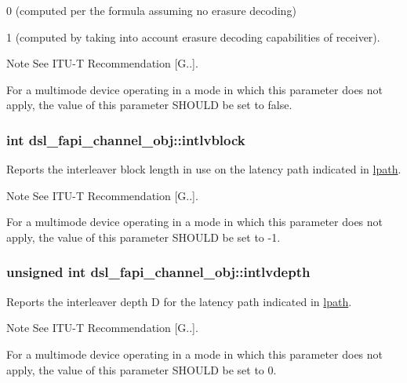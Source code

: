 \begin{DoxyItemize}
\item 0 (computed per the formula assuming no erasure decoding)
\item 1 (computed by taking into account erasure decoding capabilities of receiver). \begin{DoxyNote}{Note}
See I\-T\-U-\/\-T Recommendation \mbox{[}G..\mbox{]}. 

For a multimode device operating in a mode in which this parameter does not apply, the value of this parameter S\-H\-O\-U\-L\-D be set to false. 
\end{DoxyNote}

\end{DoxyItemize}\hypertarget{structdsl__fapi__channel__obj_aad9cd84951ffa3d57ee807b69ecd5f7a}{
\subsubsection[{intlvblock}]{\setlength{\rightskip}{0pt plus 5cm}int dsl\-\_\-fapi\-\_\-channel\-\_\-obj\-::intlvblock}}\label{structdsl__fapi__channel__obj_aad9cd84951ffa3d57ee807b69ecd5f7a}
Reports the interleaver block length in use on the latency path indicated in \hyperlink{structdsl__fapi__channel__obj_a29ec0882fb5449a659485d51f50b3b52}{lpath}. \begin{DoxyNote}{Note}
See I\-T\-U-\/\-T Recommendation \mbox{[}G..\mbox{]}. 

For a multimode device operating in a mode in which this parameter does not apply, the value of this parameter S\-H\-O\-U\-L\-D be set to -\/1. 
\end{DoxyNote}
\hypertarget{structdsl__fapi__channel__obj_afe9874cfeee95e864a6fc502d41200dd}{
\subsubsection[{intlvdepth}]{\setlength{\rightskip}{0pt plus 5cm}unsigned int dsl\-\_\-fapi\-\_\-channel\-\_\-obj\-::intlvdepth}}\label{structdsl__fapi__channel__obj_afe9874cfeee95e864a6fc502d41200dd}
Reports the interleaver depth D for the latency path indicated in \hyperlink{structdsl__fapi__channel__obj_a29ec0882fb5449a659485d51f50b3b52}{lpath}. \begin{DoxyNote}{Note}
See I\-T\-U-\/\-T Recommendation \mbox{[}G..\mbox{]}. 

For a multimode device operating in a mode in which this parameter does not apply, the value of this parameter S\-H\-O\-U\-L\-D be set to 0. 
\end{DoxyNote}
